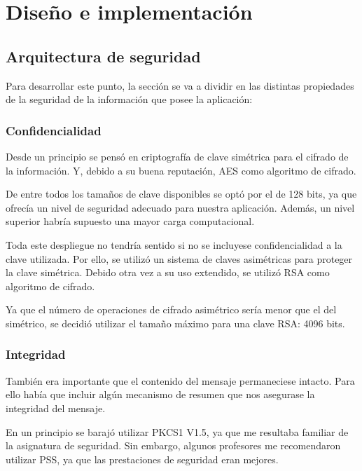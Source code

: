 
\chapter{Diseño e implementación} %

\label{Chapter4} %


\section{Arquitectura de seguridad}

Para desarrollar este punto, la sección se va a dividir en las distintas
propiedades de la seguridad de la información que posee la aplicación:

\subsection{Confidencialidad}

Desde un principio se pensó en criptografía de clave simétrica para el cifrado
de la información. Y, debido a su buena reputación, AES como algoritmo de
cifrado.

De entre todos los tamaños de clave disponibles se optó por el de
128 bits, ya que ofrecía un nivel de seguridad adecuado para nuestra aplicación.
Además, un nivel superior habría supuesto una mayor carga computacional.

Toda este despliegue no tendría sentido si no se incluyese confidencialidad a
la clave utilizada. Por ello, se utilizó un sistema de claves asimétricas para
proteger la clave simétrica. Debido otra vez a su uso extendido, se utilizó RSA
como algoritmo de cifrado.

Ya que el número de operaciones de cifrado asimétrico sería menor que el del
simétrico, se decidió utilizar el tamaño máximo para una clave RSA: 4096 bits.

\subsection{Integridad}

También era importante que el contenido del mensaje permaneciese intacto. Para
ello había que incluir algún mecanismo de resumen que nos asegurase la
integridad del mensaje.

En un principio se barajó utilizar PKCS1 V1.5, ya que me resultaba familiar de
la asignatura de seguridad. Sin embargo, algunos profesores me recomendaron
utilizar PSS, ya que las prestaciones de seguridad eran mejores.

